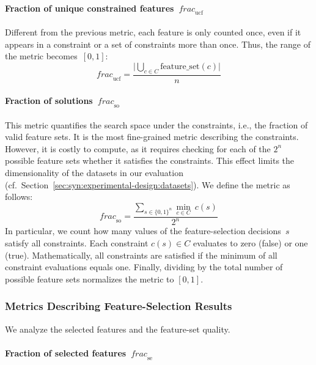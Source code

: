 \paragraph{Fraction of unique constrained features~$\mathit{frac}_{\text{ucf}}$}

Different from the previous metric, each feature is only counted once, even if it appears in a constraint or a set of constraints more than once.
Thus, the range of the metric becomes~$[0, 1]$:
%
\begin{equation}
	\mathit{frac}_{\text{ucf}} = \frac{\bigl\lvert \underset{c \in C}{\bigcup} \text{feature\_set}(c) \bigr\rvert}{n}
\end{equation}

\paragraph{Fraction of solutions~$\mathit{frac}_{\text{so}}$}

This metric quantifies the search space under the constraints, i.e., the fraction of valid feature sets.
It is the most fine-grained metric describing the constraints.
However, it is costly to compute, as it requires checking for each of the $2^n$ possible feature sets whether it satisfies the constraints.
This effect limits the dimensionality of the datasets in our evaluation (cf.~Section~\ref{sec:syn:experimental-design:datasets}).
We define the metric as follows:
%
\begin{equation}
	\mathit{frac}_{\text{so}} = \frac{\sum_{s \in \{0,1\}^n} \underset{c \in C}{\min}~c(s)}{2^n}
\end{equation}
%
In particular, we count how many values of the feature-selection decisions~$s$ satisfy all constraints.
Each constraint $c(s) \in C$ evaluates to zero (false) or one (true).
Mathematically, all constraints are satisfied if the minimum of all constraint evaluations equals one.
Finally, dividing by the total number of possible feature sets normalizes the metric to $[0, 1]$.

\subsubsection{Metrics Describing Feature-Selection Results}
\label{sec:syn:experimental-design:metrics:feature-selection}

We analyze the selected features and the feature-set quality.

\paragraph{Fraction of selected features~$\mathit{frac}_{\text{se}}$}


